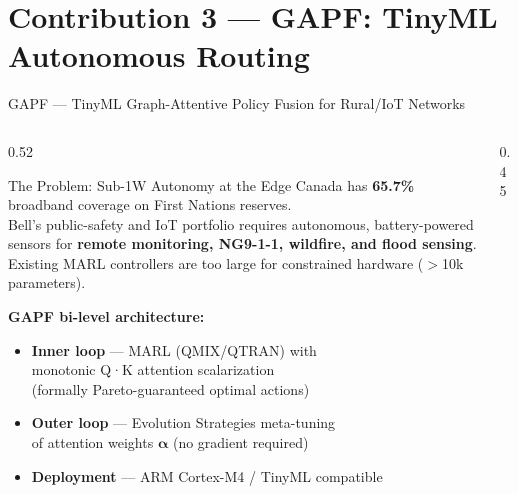 \documentclass[aspectratio=169, 11pt]{beamer}
\begin{document}
\section{Contribution 3 — GAPF: TinyML Autonomous Routing}

\begin{frame}{GAPF — TinyML Graph-Attentive Policy Fusion for Rural/IoT Networks}

\begin{columns}[T]
\begin{column}{0.52\textwidth}

  \begin{block}{The Problem: Sub-1W Autonomy at the Edge}
    \vspace{2pt}
    Canada has \textbf{65.7\%} broadband coverage on First Nations reserves.\\
    Bell's public-safety and IoT portfolio requires autonomous,
    battery-powered sensors for \textbf{remote monitoring, NG9-1-1,
    wildfire, and flood sensing}.\\[4pt]
    Existing MARL controllers are too large for constrained hardware ($>$10k parameters).
    \vspace{2pt}
  \end{block}

  \vspace{4pt}
  \textbf{GAPF bi-level architecture:}
  \begin{itemize}\setlength{\itemsep}{2pt}
    \item \textbf{Inner loop} — MARL (QMIX/QTRAN) with\\
          monotonic Q·K attention scalarization\\
          (formally Pareto-guaranteed optimal actions)
    \item \textbf{Outer loop} — Evolution Strategies meta-tuning\\
          of attention weights $\boldsymbol{\alpha}$ (no gradient required)
    \item \textbf{Deployment} — ARM Cortex-M4 / TinyML compatible
  \end{itemize}

\end{column}
\begin{column}{0.45\textwidth}


\end{column}
\end{columns}
\end{frame}
\end{document}
